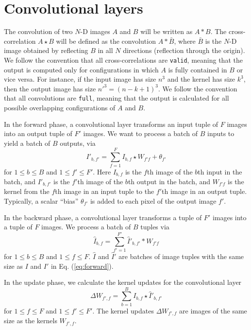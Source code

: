 \section{Convolutional layers} \label{sec-conv-layers}
  The convolution of two $N$-D images $A$ and $B$ will be written as
  $A*B$.  The cross-correlation $A\star B$ will be defined as the
  convolution $A\ast\bar{B}$, where $\bar{B}$ is the $N$-D
  image obtained by reflecting $B$ in all $N$ directions (reflection
  through the origin). We follow the convention that all
  cross-correlations are \texttt{valid}, meaning that the output is
  computed only for configurations in which $A$ is fully contained in
  $B$ or vice versa.  For instance, if the input image has size $n^3$
  and the kernel has size $k^3$, then the output image has size $n'^3
  = (n-k+1)^3$.  We follow the convention that all convolutions are
  \texttt{full}, meaning that the output is calculated for all
  possible overlapping configurations of $A$ and $B$.

  In the forward phase, a convolutional layer transforms an input
  tuple of $F$ images into an output tuple of $F'$ images.  We want to
  process a batch of $B$ inputs to yield a batch of $B$ outputs, via
  \begin{equation}\label{eq:forward}
  I'_{b,f'} = \sum_{f=1}^F I_{b,f}\star W_{f'f} + \theta_{f'}
  \end{equation}
  for $1 \le b \le B$ and $1 \le f' \le F'$.  Here $I_{b,f}$ is the
  $f$th image of the $b$th input in the batch, and $I'_{b,f'}$ is
  the $f'$th image of the $b$th output in the batch, and $W_{f'f}$
  is the kernel from the $f$th image in an input tuple to the
  $f'$th image in an output tuple.  Typically, a scalar ``bias''
  $\theta_{f'}$ is added to each pixel of the output image $f'$.

  In the backward phase, a convolutional layer transforms a tuple of
  $F'$ images into a tuple of $F$ images.  We process a batch of $B$
  tuples via
  \begin{equation}\label{eq:backward}
  \hat{I}_{b,f} = \sum_{f'=1}^{F'} \hat{I}'_{b,f'} \ast W_{f'f}
  \end{equation}
  for $1 \le b \le B$ and $1 \le f \le F$.  $\hat{I}$ and $\hat{I}'$
  are batches of image tuples with the same size as $I$ and $I'$ in
  Eq. (\ref{eq:forward}).

  In the update phase, we calculate the kernel updates for the
  convolutional layer
  \begin{equation}\label{eq:update}
  \Delta W_{f',f} = \sum_{b=1}^B I_{b,f} \star \hat{I}'_{b,f'}
  \end{equation}
  for $1 \le f \le F$ and $1 \le f'\le F'$.  The kernel updates
  $\Delta W_{f',f}$ are images of the same size as the kernels
  $W_{f',f}$.

